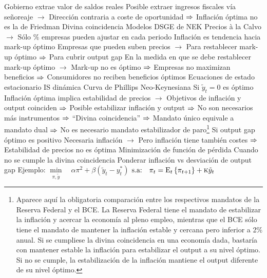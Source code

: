 \documentclass{nuevotema}
\begin{document}
\begin{esquemal}
				\4[] Gobierno extrae valor de saldos reales
				\4 Posible extraer ingresos fiscales vía señoreaje
				\4[] $\to$ Dirección contraria a coste de oportunidad
				\4[] $\Rightarrow$ Inflación óptima no es la de Friedman
			\3 Divina coincidencia
				\4 Modelos DSGE de NEK
				\4[] Precios à la Calvo
				\4[] $\to$ Sólo $\%$ empresas pueden ajustar en cada periodo
				\4 Inflación es tendencia hacia mark-up óptimo
				\4[] Empresas que pueden suben precios
				\4[] $\to$ Para restablecer mark-up óptimo
				\4[] $\Rightarrow$ Para cubrir output gap
				\4[] En la medida en que se debe restablecer mark-up óptimo
				\4[] $\to$ Mark-up no es óptimo
				\4[] $\Rightarrow$ Empresas no maximizan beneficios
				\4[] $\Rightarrow$ Consumidores no reciben beneficios óptimos
				\4 Ecuaciones de estado estacionario
				\4[DIS] IS dinámica
				\4[] 
				\4[NKPC] Curva de Phillips Neo-Keynesiana
				\4[] 
				\4 Si $\tilde{y}_t = 0$ es óptimo
				\4[] Inflación óptima implica estabilidad de precios
				\4[] $\to$ Objetivos de inflación y output coinciden
				\4[] $\Rightarrow$ Posible estabilizar inflación y output
				\4[] $\Rightarrow$ No son necesarios más instrumentos
				\4[] $\Rightarrow$ ``Divina coincidencia''
				\4[] $\Rightarrow$ Mandato único equivale a mandato dual
				\4[] $\Rightarrow$ No es necesario mandato estabilizador de paro\footnote{Aparece aquí la obligatoria comparación entre los respectivos mandatos de la Reserva Federal y el BCE. La Reserva Federal tiene el mandato de estabilizar la inflación y acercar la economía al pleno empleo, mientras que el BCE sólo tiene el mandato de mantener la inflación estable y cercana pero inferior a 2\% anual. Si se cumpliese la divina coincidencia en una economía dada, bastaría con mantener estable la inflación para estabilizar el output a su nivel óptimo. Si no se cumple, la estabilización de la inflación mantiene el output diferente de su nivel óptimo.}
				\4 Si output gap óptimo es positivo
				\4[] Necesaria inflación
				\4[] $\to$ Pero inflación tiene también costes
				\4[] $\Rightarrow$ Estabilidad de precios no es óptima
				\4 Minimización de función de pérdida
				\4[] Cuando no se cumple la divina coincidencia
				\4[] Ponderar inflación vs desviación de output gap
				\4[] Ejemplo:
				\4[] $\underset{\pi, \tilde{y}}{\min} \quad \alpha \pi^2 + \beta(\tilde{y}_t - y^*_t)$
				\4[] $\text{s.a:} \quad \pi_t = \text{E}_t \left\lbrace \pi_{t+1} \right\rbrace + \textsc{k} \tilde{y}_t $

\end{esquemal}
\end{document}
